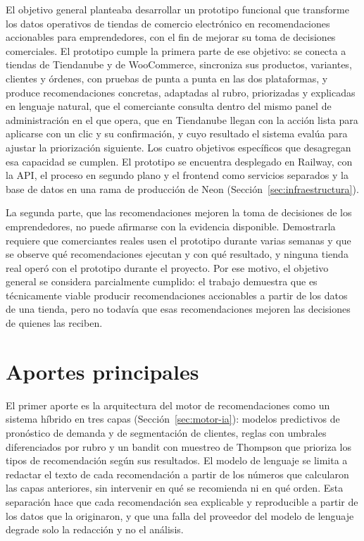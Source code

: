 El objetivo general planteaba desarrollar un prototipo funcional que transforme los datos operativos de tiendas de comercio electrónico en recomendaciones accionables para emprendedores, con el fin de mejorar su toma de decisiones comerciales. El prototipo cumple la primera parte de ese objetivo: se conecta a tiendas de Tiendanube y de WooCommerce, sincroniza sus productos, variantes, clientes y órdenes, con pruebas de punta a punta en las dos plataformas, y produce recomendaciones concretas, adaptadas al rubro, priorizadas y explicadas en lenguaje natural, que el comerciante consulta dentro del mismo panel de administración en el que opera,
que en Tiendanube llegan con la acción lista para aplicarse con un clic y su confirmación, y cuyo resultado el sistema evalúa para ajustar la priorización siguiente. Los cuatro objetivos específicos que desagregan esa capacidad se cumplen. El prototipo se encuentra desplegado en Railway, con la API, el proceso en segundo plano y el frontend como servicios separados y la base de datos en una rama de producción de Neon (Sección~\ref{sec:infraestructura}).

La segunda parte, que las recomendaciones mejoren la toma de decisiones de los emprendedores, no puede afirmarse con la evidencia disponible. Demostrarla requiere que comerciantes reales usen el prototipo durante varias semanas y que se observe qué recomendaciones ejecutan y con qué resultado, y ninguna tienda real operó con el prototipo durante el proyecto. Por ese motivo, el objetivo general se considera parcialmente cumplido: el trabajo demuestra que es técnicamente viable producir recomendaciones accionables a partir de los datos de una tienda, pero no todavía que esas recomendaciones mejoren las decisiones de quienes las reciben.

\section{Aportes principales}
\label{sec:conclusiones-aportes}

El primer aporte es la arquitectura del motor de recomendaciones como un sistema híbrido en tres capas (Sección~\ref{sec:motor-ia}): modelos predictivos de pronóstico de demanda y de segmentación de clientes, reglas con umbrales diferenciados por rubro y un bandit con muestreo de Thompson que prioriza los tipos de recomendación según sus resultados. El modelo de lenguaje se limita a redactar el texto de cada recomendación a partir de los números que calcularon las capas anteriores, sin intervenir en qué se recomienda ni en qué orden. Esta separación hace que cada recomendación sea explicable y reproducible a partir de los datos que la originaron, y que una falla del proveedor del modelo de lenguaje degrade solo la redacción y no el análisis.

